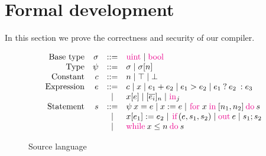 \newcommand{\kw}[1]{{\lstinline[basicstyle=\small\color{magenta}]{#1}}}
\newcommand{\ftext}[1]{\text{\small{#1}}}
\newcommand{\cond}[3]{\ensuremath{{{#1}\:?\:{#2}\::{#3}}}}
\newcommand{\for}[4]{\ensuremath{\kw{for}\:{#1}\:\kw{in}\:[{#2}, {#3}]\:\kw{do}\:{#4}}}
\newcommand{\ite}[3]{\ensuremath{\kw{if}({#1}, {#2}, {#3})}}
\newcommand{\loops}[3]{\ensuremath{\kw{while}\:{#1} \leq {#2}\:\kw{do}\:{#3}}}

\section{Formal development}
\label{sec:ld}

In this section we prove the correctness and security of our compiler.

\begin{figure}
  \[
  \begin{array}{rrcl}
    \ftext{Base type} & \sigma &::=& \kw{uint} \mid \kw{bool}\\
    \ftext{Type} & \psi &::=& \sigma \mid \sigma[n]\\
    \ftext{Constant} & c &::=& n \mid \top \mid \bot\\
    \ftext{Expression} & e &::=& c \mid x \mid e_{1} + e_{2} \mid e_{1} > e_{2} \mid \cond{e_{1}}{e_{2}}{e_{3}}\\
    & &\mid& x[e] \mid [\overline{e_{i}}]_{n} \mid \kw{in}_{j}\\
    \ftext{Statement} & s &::=& \psi\:x = e \mid x := e \mid \for{x}{n_{1}}{n_{2}}{s}\\
    & & \mid& x[e_{1}] := e_{2} \mid \ite{e}{s_{1}}{s_{2}} \mid \kw{out}\:e \mid s_{1}; s_{2}\\
    & & \mid& \loops{x}{n}{s}
  \end{array}
  \]
\label{fig:srclang}
\caption{Source language}
\end{figure}

